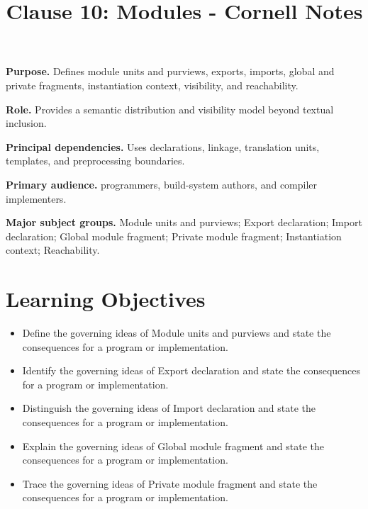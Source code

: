 \documentclass[11pt,letterpaper]{article}
\title{Clause 10: Modules - Cornell Notes}
\author{}
\date{}
\begin{document}
\maketitle
\begin{CornellReferenceOrientationBox}
\textbf{Purpose.} Defines module units and purviews, exports, imports, global and private fragments, instantiation context, visibility, and reachability.
\par\textbf{Role.} Provides a semantic distribution and visibility model beyond textual inclusion.
\par\textbf{Principal dependencies.} Uses declarations, linkage, translation units, templates, and preprocessing boundaries.
\par\textbf{Primary audience.} programmers, build-system authors, and compiler implementers.
\par\textbf{Major subject groups.} Module units and purviews; Export declaration; Import declaration; Global module fragment; Private module fragment; Instantiation context; Reachability.
\end{CornellReferenceOrientationBox}
\section{Learning Objectives}
\begin{itemize}[label=\textcolor{CornellReferenceTeal}{$\blacktriangleright$}]
\item Define the governing ideas of Module units and purviews and state the consequences for a program or implementation.
\item Identify the governing ideas of Export declaration and state the consequences for a program or implementation.
\item Distinguish the governing ideas of Import declaration and state the consequences for a program or implementation.
\item Explain the governing ideas of Global module fragment and state the consequences for a program or implementation.
\item Trace the governing ideas of Private module fragment and state the consequences for a program or implementation.
\end{itemize}
\end{document}
